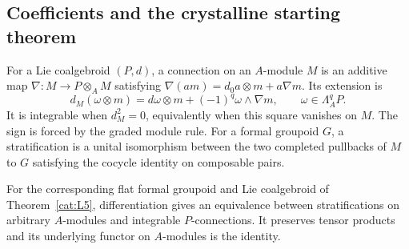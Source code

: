 \subsection{Coefficients and the crystalline starting theorem}
For a Lie coalgebroid $(P,d)$, a connection on an $A$-module $M$ is an
additive map $\nabla:M\to P\otimes_A M$ satisfying
$\nabla(am)=d_0a\otimes m+a\nabla m$.  Its extension is
\[
 d_M(\omega\otimes m)=d\omega\otimes m+
          (-1)^q\omega\wedge\nabla m,
 \qquad\omega\in\Lambda_A^qP.
\]
It is integrable when $d_M^2=0$, equivalently when this square vanishes
on $M$.  The sign is forced by the graded module rule.
For a formal groupoid $G$, a stratification is a unital isomorphism
between the two completed pullbacks of $M$ to $G$ satisfying the cocycle
identity on composable pairs.

\begin{theorem}\label{cat:L6}
For the corresponding flat formal groupoid and Lie coalgebroid of
Theorem~\ref{cat:L5}, differentiation gives an equivalence between
stratifications on arbitrary $A$-modules and integrable $P$-connections.
It preserves tensor products and its underlying functor on $A$-modules
is the identity.
\end{theorem}
